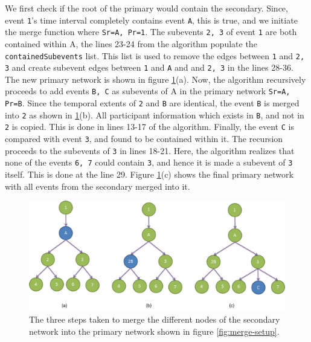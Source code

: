 We first check if the root of the primary would contain the secondary. Since, event \texttt{1}'s time interval completely contains event \texttt{A}, this is true, and we initiate the merge function where \texttt{Sr=A, Pr=1}. The subevents \texttt{2, 3} of event \texttt{1} are both contained within A, the lines 23-24 from the algorithm populate the \texttt{containedSubevents} list. This list is used to remove the edges between \texttt{1} and \texttt{2, 3} and create subevent edges between \texttt{1} and \texttt{A} and  and \texttt{2, 3} in the lines 28-36. The new primary network is shown in figure \ref{fig:merge-output-stages}(a). Now, the algorithm recursively proceeds to add events \texttt{B, C} as subevents of A in the primary network \texttt{Sr=A, Pr=B}. Since the temporal extents of \texttt{2} and \texttt{B} are identical, the event \texttt{B} is merged into \texttt{2} as shown in \ref{fig:merge-output-stages}(b). All participant information which exists in \texttt{B}, and not in \texttt{2} is copied. This is done in lines 13-17 of the algorithm. Finally, the event \texttt{C} is compared with event \texttt{3}, and found to be contained within it. The recursion proceeds to the subevents of \texttt{3} in lines 18-21. Here, the algorithm realizes that none of the events \texttt{6, 7} could contain \texttt{3}, and hence it is made a subevent of \texttt{3} itself. This is done at the line 29. Figure \ref{fig:merge-output-stages}(c) shows the final primary network with all events from the secondary merged into it.

\begin{figure}[h]
\centering
\includegraphics[width=\textwidth]{media/chapter4/merge-example-output.png}
\caption{The three steps taken to merge the different nodes of the secondary network into the primary network shown in figure \ref{fig:merge-setup}.}
\label{fig:merge-output-stages}
\end{figure}



